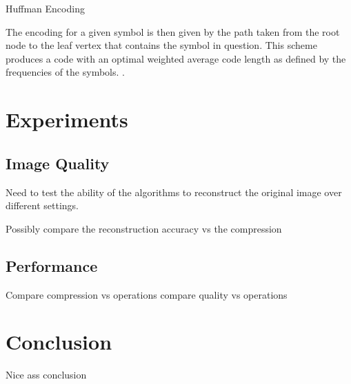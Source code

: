 \documentclass[review,onefignum,onetabnum]{siamart190516}
\begin{document}
\begin{algorithm}
  \caption{Huffman Encoding}
  \label{alg:huffman}
  \begin{algorithmic}[1]

  \ENDWHILE
  \end{algorithmic}
\end{algorithm}

The encoding for a given symbol is then given by the path taken from the root node
to the leaf vertex that contains the symbol in question. This scheme produces a 
code with an optimal weighted average code length as defined by the frequencies of the symbols. \cite{huffman1952method}.

\section{Experiments}
\subsection{Image Quality}
Need to test the ability of the algorithms to reconstruct the original image 
over different settings.

Possibly compare the reconstruction accuracy vs the compression

\lipsum[26-30]

\subsection{Performance}
Compare compression vs operations
compare quality vs operations

\lipsum[31-32]

\section{Conclusion}
Nice ass conclusion

\lipsum[33-34]

\pagebreak


\end{document}
